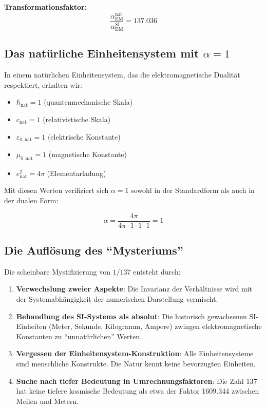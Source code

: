 \documentclass[12pt,a4paper]{article}
\begin{document}
\textbf{Transformationsfaktor:}
\begin{equation}
	\frac{\alpha_{\text{EM}}^{\text{nat}}}{\alpha_{\text{EM}}^{\text{SI}}} = 137.036
\end{equation}

\subsection{Das natürliche Einheitensystem mit $\alpha = 1$}
\label{subsec:natural_units}

In einem natürlichen Einheitensystem, das die elektromagnetische Dualität respektiert, erhalten wir:

\begin{itemize}
	\item $\hbar_{\text{nat}} = 1$ (quantenmechanische Skala)
	\item $c_{\text{nat}} = 1$ (relativistische Skala)
	\item $\varepsilon_{0,\text{nat}} = 1$ (elektrische Konstante)
	\item $\mu_{0,\text{nat}} = 1$ (magnetische Konstante)
	\item $e_{\text{nat}}^2 = 4\pi$ (Elementarladung)
\end{itemize}

Mit diesen Werten verifiziert sich $\alpha = 1$ sowohl in der Standardform als auch in der dualen Form:

\begin{equation}
	\alpha = \frac{4\pi}{4\pi \cdot 1 \cdot 1 \cdot 1} = 1
\end{equation}

\subsection{Die Auflösung des ``Mysteriums''}
\label{subsec:mystery_resolution}

Die scheinbare Mystifizierung von $1/137$ entsteht durch:

\begin{enumerate}
	\item \textbf{Verwechslung zweier Aspekte}: Die Invarianz der Verhältnisse wird mit der Systemabhängigkeit der numerischen Darstellung vermischt.
	
	\item \textbf{Behandlung des SI-Systems als absolut}: Die historisch gewachsenen SI-Einheiten (Meter, Sekunde, Kilogramm, Ampere) zwingen elektromagnetische Konstanten zu ``unnatürlichen'' Werten.
	
	\item \textbf{Vergessen der Einheitensystem-Konstruktion}: Alle Einheitensysteme sind menschliche Konstrukte. Die Natur kennt keine bevorzugten Einheiten.
	
	\item \textbf{Suche nach tiefer Bedeutung in Umrechnungsfaktoren}: Die Zahl 137 hat keine tiefere kosmische Bedeutung als etwa der Faktor 1609.344 zwischen Meilen und Metern.
\end{enumerate}
\end{document}
